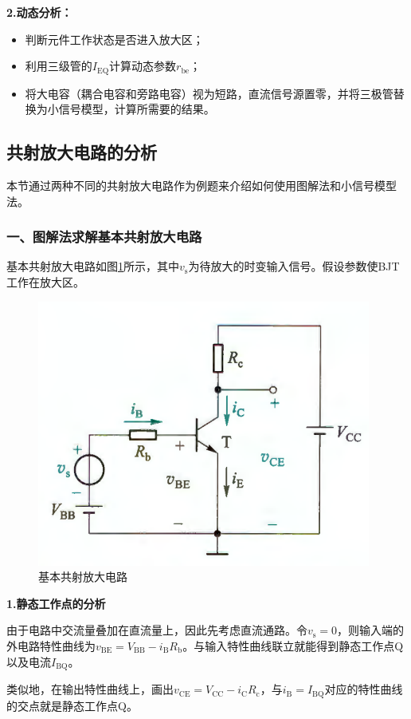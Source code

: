 \textbf{2.动态分析：}

\begin{itemize}
    \item 判断元件工作状态是否进入放大区；
    \item 利用三级管的$I_{\mathrm{EQ}}$计算动态参数$r_{\mathrm{be}}$；
    \item 将大电容（耦合电容和旁路电容）视为短路，直流信号源置零，并将三极管替换为小信号模型，计算所需要的结果。
\end{itemize}

\subsection{共射放大电路的分析}
本节通过两种不同的共射放大电路作为例题来介绍如何使用图解法和小信号模型法。

\subsubsection{一、图解法求解基本共射放大电路}

基本共射放大电路如图\ref{基本共射放大电路}所示，其中$v_{\mathrm{s}}$为待放大的时变输入信号。假设参数使BJT工作在放大区。

\begin{figure}[htb]
    \centering
    \includegraphics[width=0.55\linewidth]{pic/基本共射放大电路.png}
    \caption{基本共射放大电路\cite{康华光}\label{基本共射放大电路}}
\end{figure}

\textbf{1.静态工作点的分析}

由于电路中交流量叠加在直流量上，因此先考虑直流通路。令$v_{\mathrm{s}}=0$，则输入端的外电路特性曲线为$v_{\mathrm{BE}}=V_{\mathrm{BB}}-i_{\mathrm{B}}R_{\mathrm{b}}$。与输入特性曲线联立就能得到静态工作点Q以及电流$I_{\mathrm{BQ}}$。

类似地，在输出特性曲线上，画出$v_{\mathrm{CE}}=V_{\mathrm{CC}}-i_{\mathrm{C}}R_{\mathrm{c}}$，与$i_{\mathrm{B}}=I_{\mathrm{BQ}}$对应的特性曲线的交点就是静态工作点Q。

